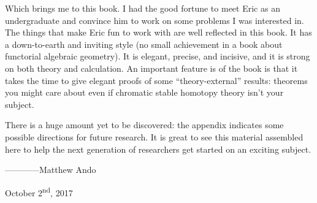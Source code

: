Which brings me to this book.  I had the good fortune to meet
Eric as an undergraduate and convince him to work on some problems I
was interested in. The things that make Eric fun to work with are
well reflected in this book.  It has a down-to-earth and inviting
style (no small achievement in a book about 
functorial algebraic geometry).  It is elegant,
precise, and incisive, and it is strong on both theory and
calculation.  An important feature is of the book is that it takes the
time to give elegant proofs of some ``theory-external'' results:
theorems you might care about even if chromatic stable homotopy theory isn't
your subject.  

There is a huge amount yet to be discovered: the appendix indicates
some possible directions for future research.  It is great to see this
material assembled here to help the next generation of researchers get
started on an exciting subject.

\vspace{2\baselineskip}
\hspace{3em} ------------Matthew Ando

\hspace{7em} October 2\textsuperscript{nd}, 2017

